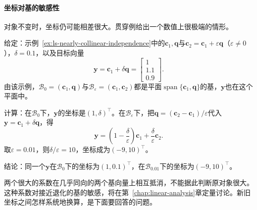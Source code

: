 \paragraph{坐标对基的敏感性}
对象不变时，坐标仍可能相差很大。贯穿例给出一个数值上很极端的情形。
\begin{example}[近共线基下的大坐标]
\label{ex:ls-coordinate-instability}
给定：示例~\ref{ex:ls-nearly-collinear-independence}中的$\bm c_1,\bm q$与$\bm c_2=\bm c_1+\varepsilon\bm q$（$\varepsilon\neq0$），$\delta=0.1$，以及目标向量
\begin{equation}
 \bm y=\bm c_1+\delta\bm q=\begin{bmatrix}1\\1.1\\0.9\end{bmatrix}.
 \label{eq:linear-algebra-nearly-collinear-target}
\end{equation}
由该示例，$\mathcal B_0=(\bm c_1,\bm q)$与$\mathcal B_\varepsilon=(\bm c_1,\bm c_2)$都是平面$\operatorname{span}\{\bm c_1,\bm q\}$的基，$\bm y$也在这个平面中。

计算：在$\mathcal B_0$下，$\bm y$的坐标是$(1,\delta)^{\top}$。在$\mathcal B_\varepsilon$下，把$\bm q=(\bm c_2-\bm c_1)/\varepsilon$代入$\bm y=\bm c_1+\delta\bm q$，得
\begin{equation}
 \bm y=\left(1-\frac{\delta}{\varepsilon}\right)\bm c_1
       +\frac{\delta}{\varepsilon}\bm c_2.
 \label{eq:linear-algebra-coordinate-instability}
\end{equation}
取$\varepsilon=0.01$，则$\delta/\varepsilon=10$，坐标成为$(-9,10)^{\top}$。

结论：同一个$\bm y$在$\mathcal B_0$下的坐标为$(1,0.1)^\top$，在$\mathcal B_{0.01}$下的坐标为$(-9,10)^\top$。
\end{example}
两个很大的系数在几乎同向的两个基向量上相互抵消，不能据此判断原对象很大。这种系数对接近退化的基的敏感，将在第~\ref{chap:linear-analysis}章定量讨论。新旧坐标之间怎样系统地换算，是下面要回答的问题。

